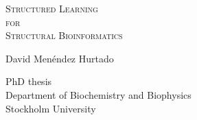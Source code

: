 \begin{titlepage}
	\begin{addmargin}[-1cm]{-3cm}
		\begin{center}
			\large
			
			\hfill
			
			\vfill
			
			\begingroup
			\Huge
			\color{Maroon}\textsc{ Structured Learning \\ for
				\\ Structural Bioinformatics} \\ \bigskip
			\endgroup
			
			\vfill
			 
			{\huge David Menéndez Hurtado}
			
			\vfill
			
			
			
			PhD thesis \\ \medskip
			Department of Biochemistry and Biophysics\\ \bigskip
			Stockholm University \\ \bigskip
			
		
			
			\vfill
			
		\end{center}
	\end{addmargin}
\end{titlepage}